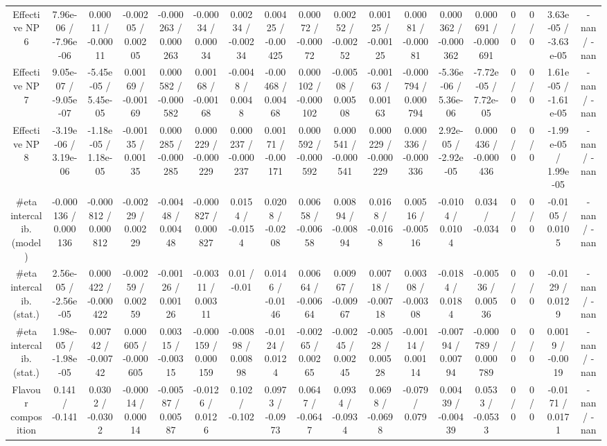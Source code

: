 \documentclass[10pt]{article}
\begin{document}
\begin{table}[htbp]
\begin{center}
\begin{tabular}{|c|c|c|c|c|c|c|c|c|c|c|c|c|c|c|c|c|c|}
  Effective NP 6 & 7.96e-06 / -7.96e-06 & 0.00011 / -0.00011 & -0.00205 / 0.00205 & -0.000263 / 0.000263 & -0.00034 / 0.00034 & 0.00234 / -0.00234 & 0.00425 / -0.00425 & 0.00072 / -0.00072 & 0.00252 / -0.00252 & 0.00125 / -0.00125 & 0.00081 / -0.00081 & 0.000362 / -0.000362 & 0.000691 / -0.000691 & 0 / 0 & 0 / 0 & 3.63e-05 / -3.63e-05 & -nan / -nan \\ 
  Effective NP 7 & 9.05e-07 / -9.05e-07 & -5.45e-05 / 5.45e-05 & 0.00169 / -0.00169 & 0.000582 / -0.000582 & 0.00168 / -0.00168 & -0.0048 / 0.0048 & -0.00468 / 0.00468 & 0.000102 / -0.000102 & -0.00508 / 0.00508 & -0.00163 / 0.00163 & -0.000794 / 0.000794 & -5.36e-06 / 5.36e-06 & -7.72e-05 / 7.72e-05 & 0 / 0 & 0 / 0 & 1.61e-05 / -1.61e-05 & -nan / -nan \\ 
  Effective NP 8 & -3.19e-06 / 3.19e-06 & -1.18e-05 / 1.18e-05 & -0.00135 / 0.00135 & 0.000285 / -0.000285 & 0.000229 / -0.000229 & 0.000237 / -0.000237 & 0.00171 / -0.00171 & 0.000592 / -0.000592 & 0.000541 / -0.000541 & 0.000229 / -0.000229 & 0.000336 / -0.000336 & 2.92e-05 / -2.92e-05 & 0.000436 / -0.000436 & 0 / 0 & 0 / 0 & -1.99e-05 / 1.99e-05 & -nan / -nan \\ 
  #eta intercalib. (model) & -0.000136 / 0.000136 & -0.000812 / 0.000812 & -0.00229 / 0.00229 & -0.00448 / 0.00448 & -0.000827 / 0.000827 & 0.0154 / -0.0154 & 0.0208 / -0.0208 & 0.00658 / -0.00658 & 0.00894 / -0.00894 & 0.0168 / -0.0168 & 0.00516 / -0.00516 & -0.0104 / 0.0104 & 0.034 / -0.034 & 0 / 0 & 0 / 0 & -0.0105 / 0.0105 & -nan / -nan \\ 
  #eta intercalib. (stat.) & 2.56e-05 / -2.56e-05 & 0.000422 / -0.000422 & -0.00259 / 0.00259 & -0.00126 / 0.00126 & -0.00311 / 0.00311 & 0.01 / -0.01 & 0.0146 / -0.0146 & 0.00664 / -0.00664 & 0.00967 / -0.00967 & 0.00718 / -0.00718 & 0.00308 / -0.00308 & -0.0184 / 0.0184 & -0.00536 / 0.00536 & 0 / 0 & 0 / 0 & -0.0129 / 0.0129 & -nan / -nan \\ 
  #eta intercalib. (stat.) & 1.98e-05 / -1.98e-05 & 0.00742 / -0.00742 & 0.000605 / -0.000605 & 0.00315 / -0.00315 & -0.000159 / 0.000159 & -0.00898 / 0.00898 & -0.0124 / 0.0124 & -0.00265 / 0.00265 & -0.00245 / 0.00245 & -0.00528 / 0.00528 & -0.00114 / 0.00114 & -0.00794 / 0.00794 & -0.000789 / 0.000789 & 0 / 0 & 0 / 0 & 0.0019 / -0.0019 & -nan / -nan \\ 
  Flavour composition & 0.141 / -0.141 & 0.0302 / -0.0302 & -0.00014 / 0.00014 & -0.00587 / 0.00587 & -0.0126 / 0.0126 & 0.102 / -0.102 & 0.0973 / -0.0973 & 0.0647 / -0.0647 & 0.0934 / -0.0934 & 0.0698 / -0.0698 & -0.079 / 0.079 & 0.00439 / -0.00439 & 0.0533 / -0.0533 & 0 / 0 & 0 / 0 & -0.0171 / 0.0171 & -nan / -nan \\ 

\end{tabular}
\end{center}
\end{table}
\end{document}
